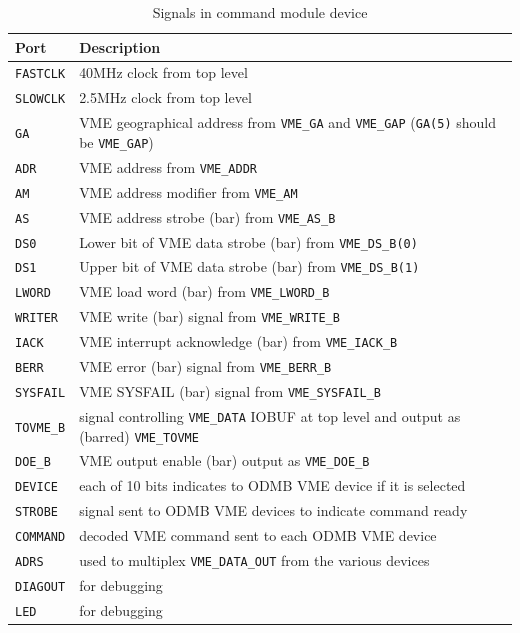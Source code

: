 \documentclass[10pt,a4paper]{article}
\begin{document}
\begin{table}[H]
\centering
\begin{tabular}{|l|l|} \hline
Port& Description\\ \hline
\texttt{FASTCLK}& 40MHz clock from top level\\ \hline
\texttt{SLOWCLK}& 2.5MHz clock from top level\\ \hline
\texttt{GA}& VME geographical address from \texttt{VME\_GA} and \texttt{VME\_GAP} (\texttt{GA(5)} should be \texttt{VME\_GAP})\\ \hline
\texttt{ADR}& VME address from \texttt{VME\_ADDR}\\ \hline
\texttt{AM}& VME address modifier from \texttt{VME\_AM}\\ \hline
\texttt{AS}& VME address strobe (bar) from \texttt{VME\_AS\_B}\\ \hline
\texttt{DS0}& Lower bit of VME data strobe (bar) from \texttt{VME\_DS\_B(0)}\\ \hline
\texttt{DS1}& Upper bit of VME data strobe (bar) from \texttt{VME\_DS\_B(1)}\\ \hline
\texttt{LWORD}& VME load word (bar) from \texttt{VME\_LWORD\_B}\\ \hline
\texttt{WRITER}& VME write (bar) signal from \texttt{VME\_WRITE\_B}\\ \hline
\texttt{IACK}& VME interrupt acknowledge (bar) from \texttt{VME\_IACK\_B}\\ \hline
\texttt{BERR}& VME error (bar) signal from \texttt{VME\_BERR\_B}\\ \hline
\texttt{SYSFAIL}& VME SYSFAIL (bar) signal from \texttt{VME\_SYSFAIL\_B}\\ \hline
\texttt{TOVME\_B}& signal controlling \texttt{VME\_DATA} IOBUF at top level and output as (barred) \texttt{VME\_TOVME}\\ \hline
\texttt{DOE\_B}& VME output enable (bar) output as \texttt{VME\_DOE\_B}\\ \hline
\texttt{DEVICE}& each of 10 bits indicates to ODMB VME device if it is selected\\ \hline
\texttt{STROBE}& signal sent to ODMB VME devices to indicate command ready\\ \hline
\texttt{COMMAND}& decoded VME command sent to each ODMB VME device\\ \hline
\texttt{ADRS}& used to multiplex \texttt{VME\_DATA\_OUT} from the various devices\\ \hline
\texttt{DIAGOUT}& for debugging\\ \hline
\texttt{LED}& for debugging\\ \hline
\end{tabular}
\caption{Signals in command module device}
\label{tab:commandinterface}
\end{table}
\end{document}
